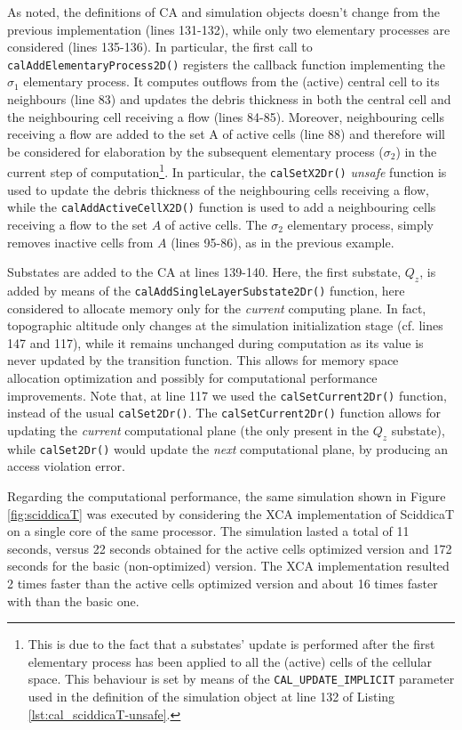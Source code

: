 As noted, the definitions of CA and simulation objects doesn't
change from the previous implementation (lines 131-132), while only
two elementary processes are considered (lines 135-136). In
particular, the first call to \verb'calAddElementaryProcess2D()'
registers the callback function implementing the $\sigma_1$ elementary
process. It computes outflows from the (active) central cell to its
neighbours (line 83) and updates the debris thickness in both the
central cell and the neighbouring cell receiving a flow (lines
84-85). Moreover, neighbouring cells receiving a flow are added to the
set A of active cells (line 88) and therefore will be considered for
elaboration by the subsequent elementary process ($\sigma_2$) in the
current step of computation\footnote{This is due to the fact that a
  substates' update is performed after the first elementary process
  has been applied to all the (active) cells of the cellular
  space. This behaviour is set by means of the
  \texttt{CAL\_UPDATE\_IMPLICIT} parameter used in the definition of
  the simulation object at line 132 of Listing
  \ref{lst:cal_sciddicaT-unsafe}.}. In particular, the
\verb'calSetX2Dr()' \emph{unsafe} function is used to update the
debris thickness of the neighbouring cells receiving a flow, while the
\verb'calAddActiveCellX2D()' function is used to add a neighbouring
cells receiving a flow to the set $A$ of active cells.  The $\sigma_2$
elementary process, simply removes inactive cells from $A$ (lines
95-86), as in the previous example.


Substates are added to the CA at lines 139-140. Here, the first
substate, $Q_z$, is added by means of the
\verb'calAddSingleLayerSubstate2Dr()' function, here considered
to allocate memory only for the \emph{current} computing plane. In
fact, topographic altitude only changes at the simulation
initialization stage (cf. lines 147 and 117), while it remains
unchanged during computation as its value is never updated by the
transition function. This allows for memory space allocation
optimization and possibly for computational performance
improvements. Note that, at line 117 we used the
\verb'calSetCurrent2Dr()' function, instead of the usual
\verb'calSet2Dr()'. The \verb'calSetCurrent2Dr()' function allows for
updating the \emph{current} computational plane (the only present in
the $Q_z$ substate), while \verb'calSet2Dr()' would update the
\emph{next} computational plane, by producing an access violation
error.

Regarding the computational performance, the same simulation shown in
Figure \ref{fig:sciddicaT} was executed by considering the XCA
implementation of SciddicaT on a single core of the same
processor. The simulation lasted a total of 11 seconds, versus 22
seconds obtained for the active cells optimized version and 172
seconds for the basic (non-optimized) version. The XCA implementation
resulted 2 times faster than the active cells optimized version and
about 16 times faster with than the basic one.



